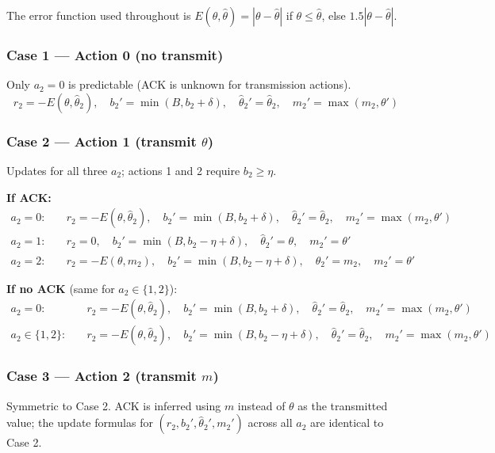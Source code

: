\documentclass[12pt, a4paper]{article}
\begin{document}
The error function used throughout is $E(\theta, \hat{\theta}) = |\theta - \hat{\theta}|$ if $\theta \leq \hat{\theta}$, else $1.5|\theta - \hat{\theta}|$.

\subsubsection*{Case 1 — Action 0 (no transmit)}

Only $a_2 = 0$ is predictable (ACK is unknown for transmission actions).
\[
r_2 = -E(\theta, \hat{\theta}_2),\quad b_2' = \min(B, b_2+\delta),\quad \hat{\theta}_2' = \hat{\theta}_2,\quad m_2' = \max(m_2, \theta')
\]

\subsubsection*{Case 2 — Action 1 (transmit $\theta$)}

Updates for all three $a_2$; actions 1 and 2 require $b_2 \geq \eta$.

\vspace{4pt}\noindent\textbf{If ACK:}
\begin{align*}
a_2=0:&\quad r_2=-E(\theta,\hat{\theta}_2),\quad b_2'=\min(B,b_2+\delta),\quad \hat{\theta}_2'=\hat{\theta}_2,\quad m_2'=\max(m_2,\theta')\\
a_2=1:&\quad r_2=0,\quad b_2'=\min(B,b_2-\eta+\delta),\quad \hat{\theta}_2'=\theta,\quad m_2'=\theta'\\
a_2=2:&\quad r_2=-E(\theta,m_2),\quad b_2'=\min(B,b_2-\eta+\delta),\quad \hat{\theta}_2'=m_2,\quad m_2'=\theta'
\end{align*}

\vspace{4pt}\noindent\textbf{If no ACK} (same for $a_2 \in \{1,2\}$):
\begin{align*}
a_2=0:&\quad r_2=-E(\theta,\hat{\theta}_2),\quad b_2'=\min(B,b_2+\delta),\quad \hat{\theta}_2'=\hat{\theta}_2,\quad m_2'=\max(m_2,\theta')\\
a_2\in\{1,2\}:&\quad r_2=-E(\theta,\hat{\theta}_2),\quad b_2'=\min(B,b_2-\eta+\delta),\quad \hat{\theta}_2'=\hat{\theta}_2,\quad m_2'=\max(m_2,\theta')
\end{align*}

\subsubsection*{Case 3 — Action 2 (transmit $m$)}

Symmetric to Case 2. ACK is inferred using $m$ instead of $\theta$ as the transmitted value; the update formulas for $(r_2, b_2', \hat{\theta}_2', m_2')$ across all $a_2$ are identical to Case 2.
\end{document}
